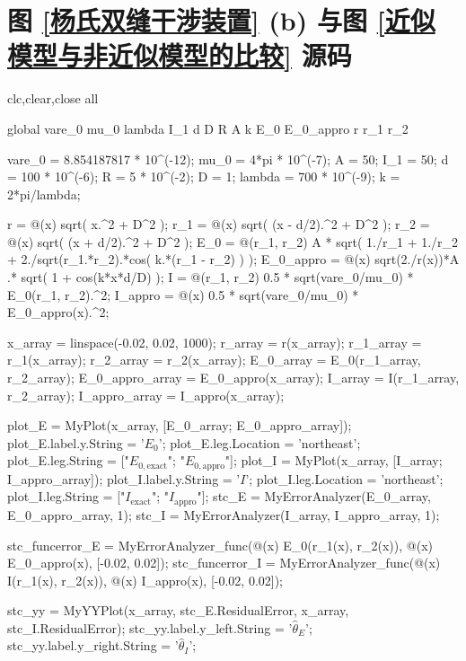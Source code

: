 \documentclass[UTF8]{report}
\theoremstyle{MyLineTheoremStyle} %
\theoremstyle{MyBlockTheoremStyle} %
\theoremstyle{MySubsubsectionStyle} %
\begin{document}
\section{图 \ref{杨氏双缝干涉装置} (b) 与图 \ref{近似模型与非近似模型的比较} 源码}\label{杨氏双缝干涉装置 源码}

\begin{matlablisting}
clc,clear,close all

global vare_0 mu_0 lambda I_1 d D R A k E_0 E_0_appro r r_1 r_2


vare_0 = 8.854187817 * 10^(-12);
mu_0 = 4*pi * 10^(-7);
A = 50;
I_1 = 50;
d = 100 * 10^(-6);
R = 5 * 10^(-2);
D = 1;
lambda = 700 * 10^(-9); %
k = 2*pi/lambda;

r = @(x) sqrt( x.^2 + D^2 );
r_1 = @(x) sqrt( (x - d/2).^2 + D^2 );
r_2 = @(x) sqrt( (x + d/2).^2 + D^2 );
E_0 = @(r_1, r_2)  A * sqrt(  1./r_1 + 1./r_2 + 2./sqrt(r_1.*r_2).*cos( k.*(r_1 - r_2) )  );
E_0_appro = @(x) sqrt(2./r(x))*A .* sqrt(  1 + cos(k*x*d/D)  );
I = @(r_1, r_2) 0.5 * sqrt(vare_0/mu_0) * E_0(r_1, r_2).^2;
I_appro = @(x) 0.5 * sqrt(vare_0/mu_0) * E_0_appro(x).^2;

x_array = linspace(-0.02, 0.02, 1000);
r_array = r(x_array);
r_1_array = r_1(x_array);
r_2_array = r_2(x_array);
E_0_array = E_0(r_1_array, r_2_array);
E_0_appro_array = E_0_appro(x_array);
I_array = I(r_1_array, r_2_array);
I_appro_array = I_appro(x_array);

plot_E = MyPlot(x_array, [E_0_array; E_0_appro_array]);
plot_E.label.y.String = '$E_0$';
plot_E.leg.Location = 'northeast';
plot_E.leg.String = ["$E_{0,\mathrm{exact}}$"; "$E_{0,\mathrm{appro}}$"];
plot_I = MyPlot(x_array, [I_array; I_appro_array]);
plot_I.label.y.String = '$I$';
plot_I.leg.Location = 'northeast';
plot_I.leg.String = ["$I_{\mathrm{exact}}$"; "$I_{\mathrm{appro}}$"];
stc_E = MyErrorAnalyzer(E_0_array, E_0_appro_array, 1);
stc_I = MyErrorAnalyzer(I_array, I_appro_array, 1);

stc_funcerror_E = MyErrorAnalyzer_func(@(x) E_0(r_1(x), r_2(x)), @(x) E_0_appro(x), [-0.02, 0.02]);
stc_funcerror_I = MyErrorAnalyzer_func(@(x) I(r_1(x), r_2(x)), @(x) I_appro(x), [-0.02, 0.02]);

stc_yy = MyYYPlot(x_array, stc_E.ResidualError, x_array, stc_I.ResidualError);
stc_yy.label.y_left.String = '$\hat{\theta}_E$';
stc_yy.label.y_right.String = '$\hat{\theta}_I$';


\end{matlablisting}
\end{document}
